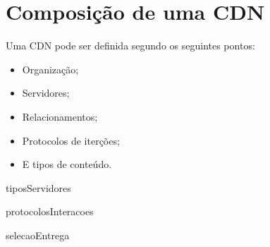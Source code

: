 \section{Composi\c{c}\~ao de uma CDN} \label{sec:composicao}
Uma CDN pode ser definida segundo os seguintes pontos:
\begin{itemize}
\item Organiza\c{c}\~ao;
\item Servidores;
\item Relacionamentos;
\item Protocolos de iter\c{c}\~oes;
\item E tipos de conte\'udo.
\end{itemize}

{tiposServidores}

{protocolosInteracoes}

{selecaoEntrega}
